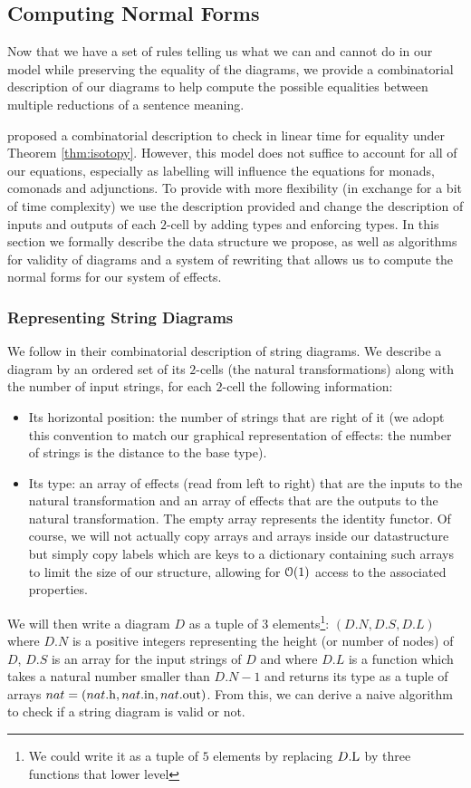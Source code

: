 \subsection{Computing Normal Forms}
Now that we have a set of rules telling us what we can and cannot do in our model while preserving the equality of the diagrams, we provide a combinatorial description of our diagrams to help compute the possible equalities between multiple reductions of a sentence meaning.

\cite{delpeuchNormalizationPlanarString2022} proposed a combinatorial description to check
in linear time for equality under Theorem \ref{thm:isotopy}.
However, this model does not suffice to account for all of our equations, especially as
labelling will influence the equations for monads, comonads and adjunctions.
To provide with more flexibility (in exchange for a bit of time complexity) we use the
description provided and change the description of inputs and outputs of each $2$-cell by
adding types and enforcing types.
In this section we formally describe the data structure we propose, as well as algorithms for
validity of diagrams and a system of rewriting that allows us to compute the normal forms
for our system of effects.

\subsubsection{Representing String Diagrams}
We follow \cite{delpeuchNormalizationPlanarString2022} in their combinatorial description
of string diagrams. We describe a diagram by an ordered set of its $2$-cells (the natural
transformations) along with the number of input strings, for each $2$-cell the following
information:
\begin{itemize}
	\item Its horizontal position: the number of strings that are right of it (we adopt this
	      convention to match our graphical representation of effects: the number of strings
	      is the distance to the base type).
	\item Its type: an array of effects (read from left to right) that are the inputs to the
	      natural transformation and an array of effects that are the outputs to the natural
	      transformation. The empty array represents the identity functor.
	      Of course, we will not actually copy arrays and arrays inside our datastructure but
	      simply copy labels which are keys to a dictionary containing such arrays to limit
	      the size of our structure, allowing for $\mathcal{O}(1)$ access to the associated properties.
\end{itemize}
We will then write a diagram $D$ as a tuple of $3$ elements\footnote{We could write it
	as a tuple of $5$ elements by replacing $D\mathrm{.L}$ by three functions that lower level}:
$\left( D.N, D.S, D.L \right)$ where $D.N$ is a positive integers representing the
height (or number of nodes) of $D$, $D.S$ is an array for the input strings of $D$ and
where $D.L$ is a function which takes a natural number smaller than $D.N - 1$ and
returns its type as a tuple of arrays
$nat = \left( nat\mathrm{.h}, nat\mathrm{.in}, nat\mathrm{.out} \right)$.
From this, we can derive a naive algorithm to check if a string diagram is
valid or not.

